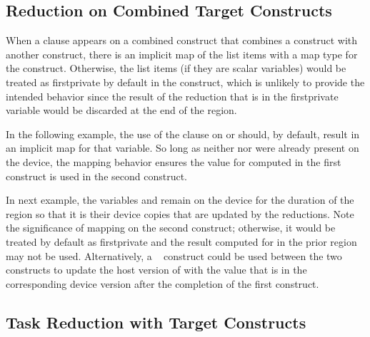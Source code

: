 \subsection{Reduction on Combined Target Constructs}
\label{subsec:target_reduction}

When a  clause appears on a combined construct that combines 
a  construct with another construct, there is an implicit map 
of the list items with a  map type for the  construct. 
Otherwise, the list items (if they are scalar variables) would be 
treated as firstprivate by default in the  construct, which 
is unlikely to provide the intended behavior since the result of the
reduction that is in the firstprivate variable would be discarded 
at the end of the  region.

In the following example, the use of the  clause on 
or  should, by default, result in an implicit  map for
that variable. So long as neither  nor  were already
present on the device, the mapping behavior ensures the value for
 computed in the first  construct is used in the
second  construct.



In next example,  the variables  and  remain on the
device for the duration of the ~ region so that it is
their device copies that are updated by the reductions. Note the significance
of mapping  on the second  construct; otherwise, it
would be treated by default as firstprivate and the result computed for
 in the prior  region may not be used. Alternatively, a
~ construct could be used between the two
 constructs to update the host version of  with the
value that is in the corresponding device version after the completion of the
first construct.




\subsection{Task Reduction with Target Constructs}
\label{subsec:target_task_reduction}

